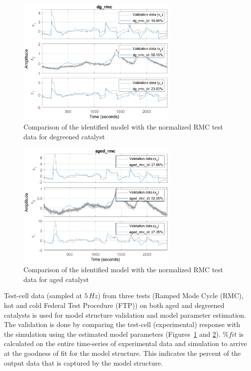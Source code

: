 \begin{figure}[h]
    \centering
    \includegraphics[width=0.7\textwidth]{Part3/figs/4_figs/dg_valid.eps}
    \caption{Comparison of the identified model with the normalized RMC test data for degreened catalyst}
    \label{fig:dg_comp}
\end{figure}

\begin{figure}[h]
    \centering
    \includegraphics[width=0.7\textwidth]{Part3/figs/4_figs/aged_valid.eps}
    \caption{Comparison of the identified model with the normalized RMC test data for aged catalyst}
    \label{fig:ag_comp}
\end{figure}

Test-cell data (sampled at $5\, Hz$) from three tests (Ramped Mode Cycle (RMC),
hot and cold Federal Test Procedure (FTP))
on both aged and degreened catalysts is used for model structure validation and
model parameter estimation. The validation is done by comparing the test-cell
(experimental) response with the simulation using the estimated model
parameters (Figures~\ref{fig:dg_comp} and \ref{fig:ag_comp}). $\%fit$ is
calculated on the entire time-series of experimental data and simulation to arrive
at the goodness of fit for the model structure. This indicates the percent of
the output data that is captured by the model structure.

